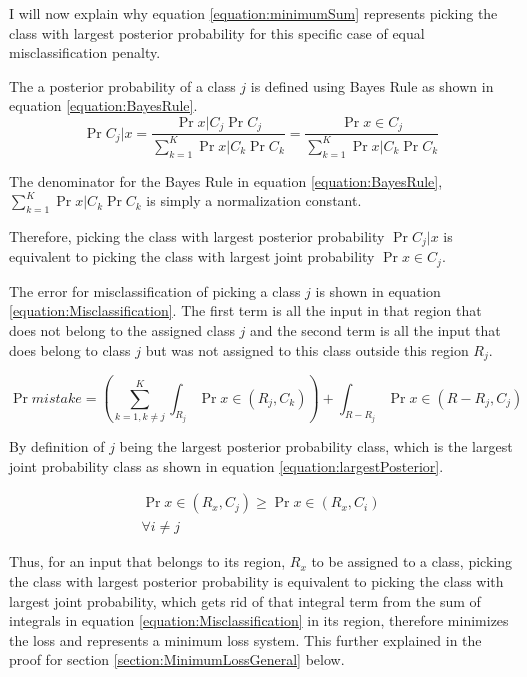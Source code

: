 \documentclass[a4paper,12pt]{article}
\begin{document}
I will now explain why equation \ref{equation:minimumSum} represents picking the class with largest posterior probability for this specific case of equal misclassification penalty. 

The a posterior probability of a class $j$ is defined using Bayes Rule as shown in equation \ref{equation:BayesRule}.
\begin{equation}
\label{equation:BayesRule}
\Pr{C_{j} | x} = \frac{\Pr{x | C_{j}} \Pr{C_{j}}}{\sum_{k=1}^{K}  \Pr{x | C_{k}} \Pr{C_{k}}} = 
\frac{\Pr{x \in C_{j}}}{\sum_{k=1}^{K}  \Pr{x | C_{k}} \Pr{C_{k}}}
\end{equation}

The denominator for the Bayes Rule in equation \ref{equation:BayesRule}, 
$\sum_{k=1}^{K}  \Pr{x | C_{k}} \Pr{C_{k}}$ is simply a normalization constant. 

Therefore, picking the class with largest posterior probability $\Pr{C_{j} | x}$ is equivalent to picking the class with largest joint probability $\Pr{x \in C_{j}}$. 

The error for misclassification of picking a class $j$ is shown in equation \ref{equation:Misclassification}. 
The first term is all the input in that region that does not belong to the assigned class $j$ and the second term is all the input that does belong to class $j$ but was not assigned to this class outside this region $R_{j}$. 

\begin{equation}
\label{equation:Misclassification}
\Pr{mistake} = (\sum_{k=1, k \neq j}^{K} \int_{R_{j}} \Pr{x \in (R_{j}, C_{k})})  + \int_{R - R_{j}} \Pr{x \in (R -R_{j}, C_{j})}
\end{equation}

By definition of $j$ being the largest posterior probability class, which is the largest joint probability class as shown in equation \ref{equation:largestPosterior}. 

\begin{equation}
\begin{split}
\label{equation:largestPosterior}
\Pr{x \in (R_{x}, C_{j})} \ge  \Pr{x \in (R_{x}, C_{i})} \\
\forall i \neq j
\end{split}
\end{equation}

Thus, for an input that belongs to its region, $R_{x}$ to be assigned to a class, picking the class with largest posterior probability is equivalent to picking the class with largest joint probability, which gets rid of that integral term from the sum of integrals in equation \ref{equation:Misclassification} in its region, therefore minimizes the loss and represents a minimum loss system. This further explained in the proof for section \ref{section:MinimumLossGeneral} below. 
\end{document}
